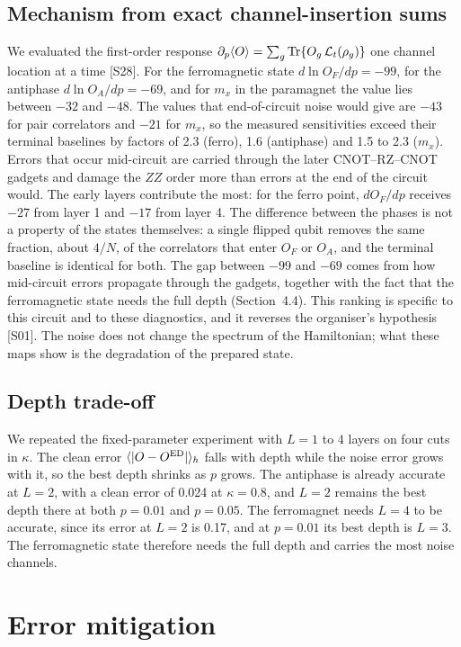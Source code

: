 \documentclass[10pt,twocolumn]{article}
\begin{document}
\subsection{Mechanism from exact channel-insertion sums}
We evaluated the first-order response $\partial_p\langle O\rangle=\sum_g{\rm Tr}\{O_g\,\mathcal L_t(\rho_g)\}$ one channel location at a time [S28]. For the ferromagnetic state $d\ln O_F/dp=-99$, for the antiphase $d\ln O_A/dp=-69$, and for $m_x$ in the paramagnet the value lies between $-32$ and $-48$. The values that end-of-circuit noise would give are $-43$ for pair correlators and $-21$ for $m_x$, so the measured sensitivities exceed their terminal baselines by factors of 2.3 (ferro), 1.6 (antiphase) and 1.5 to 2.3 ($m_x$). Errors that occur mid-circuit are carried through the later CNOT--RZ--CNOT gadgets and damage the $ZZ$ order more than errors at the end of the circuit would. The early layers contribute the most: for the ferro point, $dO_F/dp$ receives $-27$ from layer 1 and $-17$ from layer 4. The difference between the phases is not a property of the states themselves: a single flipped qubit removes the same fraction, about $4/N$, of the correlators that enter $O_F$ or $O_A$, and the terminal baseline is identical for both. The gap between $-99$ and $-69$ comes from how mid-circuit errors propagate through the gadgets, together with the fact that the ferromagnetic state needs the full depth (Section~4.4). This ranking is specific to this circuit and to these diagnostics, and it reverses the organiser's hypothesis [S01]. The noise does not change the spectrum of the Hamiltonian; what these maps show is the degradation of the prepared state.

\subsection{Depth trade-off}
We repeated the fixed-parameter experiment with $L=1$ to $4$ layers on four cuts in $\kappa$. The clean error $\langle|O-O^{\rm ED}|\rangle_h$ falls with depth while the noise error grows with it, so the best depth shrinks as $p$ grows. The antiphase is already accurate at $L=2$, with a clean error of 0.024 at $\kappa=0.8$, and $L=2$ remains the best depth there at both $p=0.01$ and $p=0.05$. The ferromagnet needs $L=4$ to be accurate, since its error at $L=2$ is 0.17, and at $p=0.01$ its best depth is $L=3$. The ferromagnetic state therefore needs the full depth and carries the most noise channels.

\section{Error mitigation}
\end{document}
